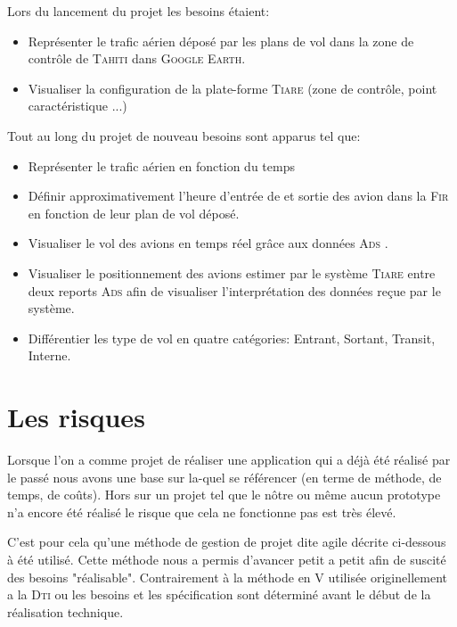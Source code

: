 Lors du lancement du projet les besoins étaient:
\begin{itemize}
    \item Représenter le trafic aérien déposé par les plans de vol dans la zone de contrôle de \textsc{Tahiti} dans \textsc{Google Earth}.
    \item Visualiser la configuration de la plate-forme \textsc{Tiare} (zone de contrôle, point caractéristique ...)
\end{itemize}\medskip
Tout au long du projet de nouveau besoins sont apparus tel que:
\begin{itemize}
    \item Représenter le trafic aérien en fonction du temps
    \item Définir approximativement l'heure d'entrée de et sortie des avion dans la \textsc{Fir}  en fonction de leur plan de vol déposé.
    \item Visualiser le vol des avions en temps réel grâce aux données \textsc{Ads} .
    \item Visualiser le positionnement des avions estimer par le système \textsc{Tiare} entre deux reports \textsc{Ads} afin de visualiser l'interprétation des données reçue par le système.
    \item Différentier les type de vol en quatre catégories: Entrant, Sortant, Transit, Interne. 
\end{itemize}\medskip

\section{Les risques}
Lorsque l'on a comme projet de réaliser une application qui a déjà été réalisé par le passé nous avons une base sur la-quel se référencer (en terme de méthode, de temps, de coûts). Hors sur un projet tel que le nôtre ou même aucun prototype n'a encore été réalisé le risque que cela ne fonctionne pas est très élevé.

C'est pour cela qu'une méthode de gestion de projet dite agile décrite ci-dessous  à été utilisé. Cette méthode nous a permis d'avancer petit a petit afin de suscité des besoins "réalisable". Contrairement à la méthode en V utilisée originellement a la \textsc{Dti} ou les besoins et les spécification sont déterminé avant le début de la réalisation technique.
